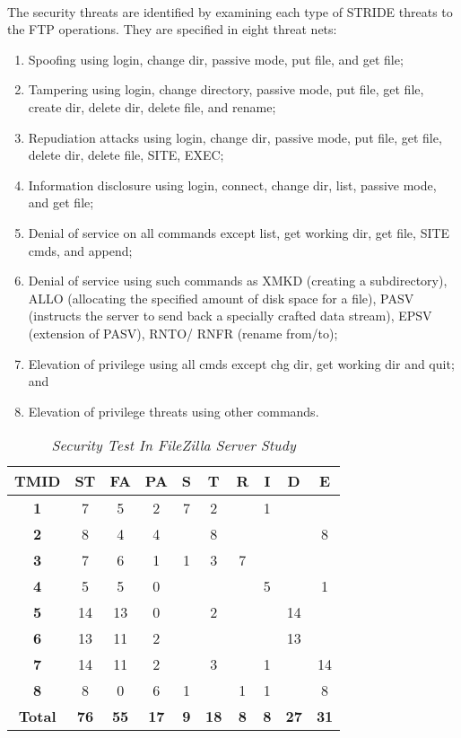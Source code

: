 \paragraph*{}
The security threats are identified by examining each
type of STRIDE threats to the FTP operations. They are
specified in eight threat nets:
\begin{enumerate}
\item Spoofing using login, change dir, passive mode, put
file, and get file;
\item Tampering using login, change directory, passive
mode, put file, get file, create dir, delete dir, delete
file, and rename;
\item Repudiation attacks using login, change dir, passive
mode, put file, get file, delete dir, delete file, SITE,
EXEC;
\item Information disclosure using login, connect, change
dir, list, passive mode, and get file;
\item Denial of service on all commands except list, get
working dir, get file, SITE cmds, and append;
\item Denial of service using such commands as XMKD
(creating a subdirectory), ALLO (allocating the
specified amount of disk space for a file), PASV
(instructs the server to send back a specially crafted
data stream), EPSV (extension of PASV), RNTO/
RNFR (rename from/to);
\item Elevation of privilege using all cmds except chg dir,
get working dir and quit; and
\item Elevation of privilege threats using other commands.
\end{enumerate}
\begin{table}
\label{Table:4}
\centering
\begin{tabular}{|c|c|c|c|c|c|c|c|c|c|}
\hline
\textbf{TMID}&\textbf{ST}&\textbf{FA}&\textbf{PA}&\textbf{S}&\textbf{T}&\textbf{R}&\textbf{I}&\textbf{D}&\textbf{E}
\\
\hline
\textbf{1} & 7 & 5 & 2 & 7 & 2 & & 1 & &
\\
\hline
\textbf{2} & 8 & 4 & 4 & & 8 & &  & &8
\\
\hline
\textbf{3} & 7 & 6 & 1 & 1 & 3 & 7 &  & &
\\
\hline
\textbf{4} & 5 & 5 & 0 & &  & & 5 & &1
\\
\hline
\textbf{5} & 14 & 13 & 0 & & 2 & &  & 14 &
\\
\hline
\textbf{6} & 13 & 11 & 2 & &  & &  & 13 &
\\
\hline
\textbf{7} & 14 & 11 & 2 & & 3 & & 1 & &14
\\
\hline
\textbf{8} & 8 & 0 & 6 & 1 &  & 1 & 1 & & 8
\\
\hline
\textbf{Total} & \textbf{76} & \textbf{55} & \textbf{17} & \textbf{9} & \textbf{18} &\textbf{8} & \textbf{8} & \textbf{27}  &\textbf{31}
\\
\hline
\end{tabular}
\caption{\textit{Security Test In FileZilla Server Study}}
\end{table}

